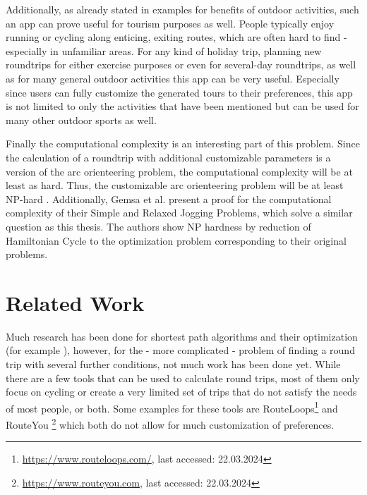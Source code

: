 Additionally, as already stated in examples for benefits of outdoor activities, such an app can prove useful for tourism purposes as well. 
People typically enjoy running or cycling along enticing, exiting routes, which are often hard to find - especially in unfamiliar areas.
For any kind of holiday trip, planning new roundtrips for either exercise purposes or even for several-day roundtrips, as well as for many general outdoor activities this app can be very useful.
Especially since users can fully customize the generated tours to their preferences, this app is not limited to only the activities that have been mentioned but can be used for many other outdoor sports as well.

Finally the computational complexity is an interesting part of this problem. 
Since the calculation of a roundtrip with additional customizable parameters is a version of the arc orienteering problem, the computational complexity will be at least as hard.
Thus, the customizable arc orienteering problem will be at least NP-hard \cite{agarwal_correlated_2023}.
Additionally, Gemsa et al. \cite{gemsa_efficient_2013} present a proof for the computational complexity of their Simple and Relaxed Jogging Problems, which solve a similar question as this thesis.
The authors show NP hardness by reduction of Hamiltonian Cycle to the optimization problem corresponding to their original problems.






\section{Related Work}
\label{sec:relatedWork}


Much research has been done for shortest path algorithms and their optimization (for example \cite{cherkassky_shortest_1996, deo_shortest-path_1984, gallo_shortest_1988, madkour_survey_2017, sommer_shortest-path_2014, wayahdi_greedy_2021}), however, for the - more complicated \cite{gemsa_efficient_2013} - problem of finding a round trip with several further conditions, not much work has been done yet.
While there are a few tools that can be used to calculate round trips, most of them only focus on cycling or create a very limited set of trips that do not satisfy the needs of most people, or both. 
Some examples for these tools are RouteLoops\footnote{\url{https://www.routeloops.com/}, last accessed: 22.03.2024} and RouteYou \footnote{\url{https://www.routeyou.com}, last accessed: 22.03.2024} which both do not allow for much customization of preferences. 

